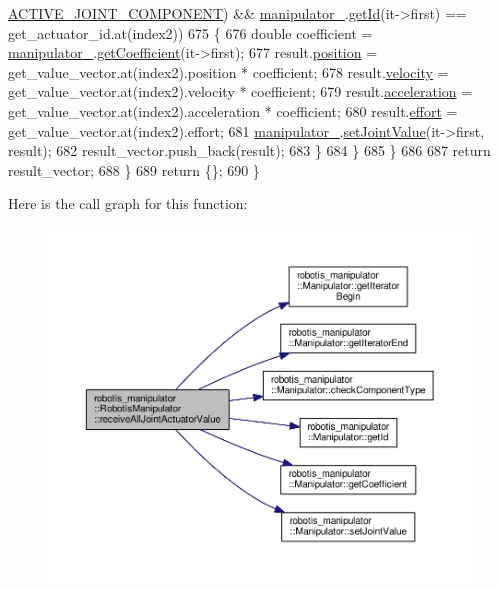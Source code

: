 \begin{DoxyCode}
      \hyperlink{namespacerobotis__manipulator_a2bbf89d1c08dc1d9ff4e28beb939e382acdf3b34914d1a2a028d882beb96fba7c}{ACTIVE\_JOINT\_COMPONENT}) && \hyperlink{classrobotis__manipulator_1_1_robotis_manipulator_a5b2df4a3b3ee7f408cb1d0eaf61644dc}{manipulator\_}.\hyperlink{classrobotis__manipulator_1_1_manipulator_a60db34ef6a62e0b15aa36f9b1571640d}{getId}(it->first) == 
      get\_actuator\_id.at(index2))
675         \{
676           \textcolor{keywordtype}{double} coefficient = \hyperlink{classrobotis__manipulator_1_1_robotis_manipulator_a5b2df4a3b3ee7f408cb1d0eaf61644dc}{manipulator\_}.\hyperlink{classrobotis__manipulator_1_1_manipulator_a437ac5f137aa788c4db07690c185e9ba}{getCoefficient}(it->first);
677           result.\hyperlink{structrobotis__manipulator_1_1_point_a0f122386b502d9b316bdead542ed2145}{position} = get\_value\_vector.at(index2).position * coefficient;
678           result.\hyperlink{structrobotis__manipulator_1_1_point_a4eaec95fac0c755eb0aa704b36ebe97b}{velocity} = get\_value\_vector.at(index2).velocity * coefficient;
679           result.\hyperlink{structrobotis__manipulator_1_1_point_adb49f1fbcc0eaa7f530c54fdf0ede836}{acceleration} = get\_value\_vector.at(index2).acceleration * coefficient;
680           result.\hyperlink{structrobotis__manipulator_1_1_point_add1a7019fc87cc2ac9bdf033372a9bb6}{effort} = get\_value\_vector.at(index2).effort;
681           \hyperlink{classrobotis__manipulator_1_1_robotis_manipulator_a5b2df4a3b3ee7f408cb1d0eaf61644dc}{manipulator\_}.\hyperlink{classrobotis__manipulator_1_1_manipulator_aa740b17551040520851ec8dc1d619bfe}{setJointValue}(it->first, result);
682           result\_vector.push\_back(result);
683         \}
684       \}
685     \}
686 
687     \textcolor{keywordflow}{return} result\_vector;
688   \}
689   \textcolor{keywordflow}{return} \{\};
690 \}
\end{DoxyCode}


Here is the call graph for this function\+:\nopagebreak
\begin{figure}[H]
\begin{center}
\leavevmode
\includegraphics[width=350pt]{classrobotis__manipulator_1_1_robotis_manipulator_a445c7e5737940b0a560d715d587eadd5_cgraph}
\end{center}
\end{figure}


